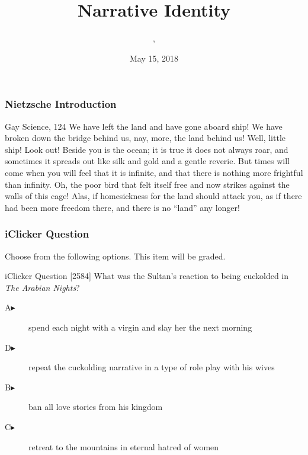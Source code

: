 \documentclass[xcolor=dvipsnames]{beamer}
\title{Narrative Identity}
\subtitle{{\CourseNumber}, {\CourseInst}}
\author{\CourseName}
\date{May 15, 2018}
\begin{document}
\begin{frame}
  \titlepage
\end{frame}

\begin{frame}
  \frametitle{Nietzsche Introduction}
  \begin{block}{Gay Science, 124}
    We have left the land and have gone aboard ship! We have broken
    down the bridge behind us, nay, more, the land behind us! Well,
    little ship! Look out! Beside you is the ocean; it is true it
    does not always roar, and sometimes it spreads out like silk and
    gold and a gentle reverie. But times will come when you will feel
    that it is infinite, and that there is nothing more frightful than
    infinity. Oh, the poor bird that felt itself free and now strikes
    against the walls of this cage! Alas, if homesickness for the
    land should attack you, as if there had been more freedom there,
    and there is no ``land'' any longer!
  \end{block}
\end{frame}

\begin{frame}
  \frametitle{iClicker Question}
Choose from the following options. This item will be graded.
\begin{block}{iClicker Question}
[2584] What was the Sultan's reaction to being cuckolded in \emph{The Arabian
Nights}?
\end{block}
\begin{description}
\item[A\hspace{.2in}$\blacktriangleright$] spend each night with a virgin and slay her the next morning
\item[D\hspace{.2in}$\blacktriangleright$] repeat the cuckolding narrative in a type of role play with his wives
\item[B\hspace{.2in}$\blacktriangleright$] ban all love stories from his kingdom
\item[C\hspace{.2in}$\blacktriangleright$] retreat to the mountains in eternal hatred of women
\end{description}
\end{frame}
\end{document}
